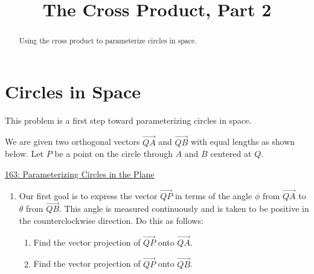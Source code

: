 \documentclass{ximera}
\title{The Cross Product, Part 2}
\begin{document}
\begin{abstract}
Using the cross product to parameterize circles in space.
\end{abstract}
\maketitle


\section{Circles in Space}

\begin{question}  \label{Qdfds45rt54rr3tg}
This problem is a first step toward parameterizing circles in space. 

We are given two orthogonal vectors $\overrightarrow{QA}$ and $\overrightarrow{QB}$ with equal lengths as shown below. Let $P$ be a point on the circle through $A$ and $B$ centered at $Q$. 

\begin{onlineOnly}
    \begin{center}
\end{center}
\end{onlineOnly}

\href{https://www.desmos.com/calculator/arrfrcusn5}{163: Parameterizing Circles in the Plane}

\begin{enumerate}
\item{Our first goal is to express the vector $\overrightarrow{QP}$ in terms of the angle $\phi$ from $\overrightarrow{QA}$ to  $\theta$ from $\overrightarrow{QB}$. This angle is measured continuously and is taken to be positive in the counterclockwise direction. Do this as follows:}

\begin{enumerate}
\item{Find the vector projection of $\overrightarrow{QP}$ onto $\overrightarrow{QA}$.
\begin{multipleChoice}
\end{multipleChoice}
}
 \item{Find the vector projection of $\overrightarrow{QP}$ onto $\overrightarrow{QB}$.
\begin{multipleChoice}
\end{multipleChoice}
}


\end{enumerate}
\end{enumerate}
\end{question}
\end{document}
